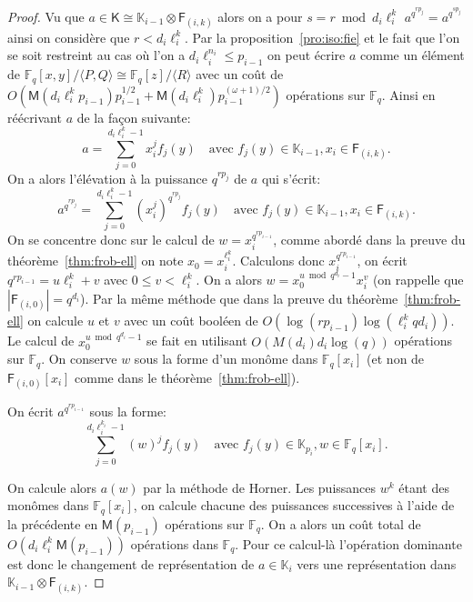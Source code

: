 \documentclass[10pt,a4paper]{book}
\theoremstyle{plain}
\theoremstyle{definition}
\theoremstyle{definition}
\theoremstyle{definition}
\theoremstyle{definition}
\theoremstyle{remark}
\theoremstyle{remark}
\theoremstyle{definition}
\begin{document}
\begin{proof}
Vu que $a \in \mathsf{K} \cong \mathbb{K}_{i-1} \otimes \mathsf{F}_{(i,k)}$
 alors on a pour $s=r \bmod d_i \ell_i^{k}$ 
$a^{q^{r p_j}}=a^{q^{s p_j}}$ ainsi on considère que $r<d_i \ell_i^{k}$.
Par la proposition~\ref{pro:iso:fie} et le fait que l'on se soit restreint au 
cas où l'on a $d_i\ell_i^{n_i} \leqslant p_{i-1}$ on peut écrire $a$ comme un 
élément de 
$\mathbb{F}_q[x,y]/\langle P,Q \rangle \cong \mathbb{F}_q[z]/\langle R \rangle$
 avec un coût de 
 $O(\mathsf{M}(d_i\ell_i^{k}p_{i-1})p_{i-1}^{1/2}+\mathsf{M}(d_i\ell_i^{k})p_{i-1}^{(\omega+1)/2})$ 
 opérations sur $\mathbb{F}_q$.
Ainsi en réécrivant $a$ de la façon suivante:
\begin{equation*}
a=\sum_{j=0}^{d_i\ell_i^{k}-1}x_i^{j}f_{j}(y) \quad \text{avec } f_{j}(y) \in \mathbb{K}_{i-1}, x_i \in \mathsf{F}_{(i,k)}.
\end{equation*}
On a alors l'élévation à la puissance $q^{r p_j}$ de $a$ qui s'écrit:
\begin{equation*}
a^{q^{r p_j}}=\sum_{j=0}^{d_i\ell_i^{k}-1}(x_i^{j})^{q^{r p_j}}f_{j}(y) \quad \text{avec } f_{j}(y) \in \mathbb{K}_{i-1}, x_i \in \mathsf{F}_{(i,k)}.
\end{equation*} 
On se concentre donc sur le calcul de $w=x_i^{q^{r p_{i-1}}}$, comme abordé dans la 
preuve du théorème~\ref{thm:frob-ell} on note $x_0=x_i^{\ell_i^{k}}$. 
Calculons donc $x_i^{q^{r p_{i-1}}}$, on écrit $q^{r p_{i-1}}= u \ell_i^{k}+v$ avec 
$0 \leqslant v<\ell_i^{k}$. On a alors $w=x_0^{u \bmod q^{d_i}-1}x_i^{v}$ (on 
rappelle que $|\mathsf{F}_{(i,0)}|=q^{d_i}$). Par la même méthode que dans la 
preuve du théorème~\ref{thm:frob-ell} on calcule $u$ et $v$ avec un coût 
booléen de $O(\log(rp_{i-1})\log(\ell_i^{k}qd_i))$. Le calcul de $x_0^{u \bmod q^{d_i}-1}$ 
se fait en utilisant $O( M(d_i) d_i\log(q))$ opérations sur $\mathbb{F}_q$. On 
conserve $w$ sous la forme d'un monôme dans $\mathbb{F}_q[x_i]$ (et non de 
$\mathsf{F}_{(i,0)}[x_i]$ comme dans le théorème~\ref{thm:frob-ell}).

On écrit $a^{q^{r p_{i-1}}}$ sous la forme:
\begin{equation*}
\sum_{j=0}^{d_i\ell_i^{k_i}-1}(w)^{j}f_{j}(y) \quad \text{avec } f_{j}(y) \in \mathbb{K}_{p_i}, w \in \mathbb{F}_{q}[x_i].
\end{equation*}

On calcule alors $a(w)$ par la méthode de Horner. Les puissances $w^k$ étant 
des monômes dans $\mathbb{F}_q[x_i]$, on calcule chacune des puissances 
successives à l'aide de la précédente en $\mathsf{M}(p_{i-1})$ opérations sur 
$\mathbb{F}_q$. On a alors un coût total de 
$O(d_i\ell_i^{k}\mathsf{M}(p_{i-1}))$ opérations dans $\mathbb{F}_q$. 
Pour ce calcul-là l'opération dominante est donc le changement de 
représentation de $a \in \mathbb{K}_i$ vers une représentation dans 
$\mathbb{K}_{i-1} \otimes \mathsf{F}_{(i,k)}$.
\end{proof}
\end{document}
